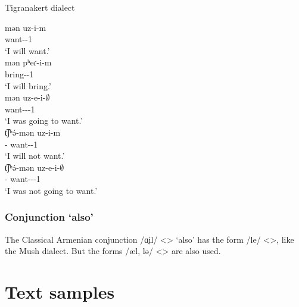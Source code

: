 \begin{exe}
	\ex Tigranakert dialect \label{sent:Tigranakert:morpho:verb:future}
	\begin{xlist}
		\ex \gll mən uz-i-m \\ 
		{\fut} want-{\thgloss}-1{\sg} \\ 
		\trans `I will want.' \\ 
		\ex \gll mən pʰeɾ-i-m \\ 
		{\fut} bring-{\thgloss}-1{\sg} \\ 
		\trans `I will bring.' \\ 
		\ex \gll mən uz-e-i-$\emptyset$ \\ 
		{\fut} want-{\thgloss}-{\pst}-1{\sg} \\ 
		\trans `I was going to want.' \\ 
		\ex \gll t͡ʃʰ\'ə-mən uz-i-m \\ 
		{\neggloss}-{\fut} want-{\thgloss}-1{\sg} \\ 
		\trans `I will not want.' \\ 
		\ex \gll t͡ʃʰ\'ə-mən uz-e-i-$\emptyset$ \\ 
		{\neggloss}-{\fut} want-{\thgloss}-{\pst}-1{\sg} \\ 
		\trans `I was not going to want.' \\ 
	\end{xlist}
\end{exe}

\subsubsection{Conjunction `also'} 

The Classical Armenian conjunction /ɑi̯l/ <> `also' has the form /le/ <>, like the Mush dialect. But the forms /æl, lə/ <> are also used. 



\section{Text samples}

{\sampleoverview}

\largerpage[2]
